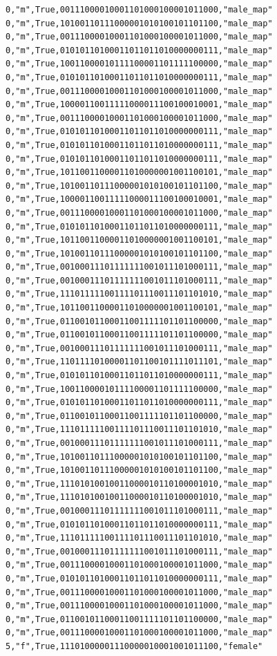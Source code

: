 \documentclass[authoryearcitations]{UoYCSproject}
\begin{document}
\begin{framed}
\begin{verbatim}
0,"m",True,00111000010001101000100001011000,"male_map"
0,"m",True,10100110111000001010100101101100,"male_map"
0,"m",True,00111000010001101000100001011000,"male_map"
0,"m",True,01010110100011011011010000000111,"male_map"
0,"m",True,10011000010111100001101111100000,"male_map"
0,"m",True,01010110100011011011010000000111,"male_map"
0,"m",True,00111000010001101000100001011000,"male_map"
0,"m",True,10000110011111000011100100010001,"male_map"
0,"m",True,00111000010001101000100001011000,"male_map"
0,"m",True,01010110100011011011010000000111,"male_map"
0,"m",True,01010110100011011011010000000111,"male_map"
0,"m",True,01010110100011011011010000000111,"male_map"
0,"m",True,10110011000011010000001001100101,"male_map"
0,"m",True,10100110111000001010100101101100,"male_map"
0,"m",True,10000110011111000011100100010001,"male_map"
0,"m",True,00111000010001101000100001011000,"male_map"
0,"m",True,01010110100011011011010000000111,"male_map"
0,"m",True,10110011000011010000001001100101,"male_map"
0,"m",True,10100110111000001010100101101100,"male_map"
0,"m",True,00100011101111111001011101000111,"male_map"
0,"m",True,00100011101111111001011101000111,"male_map"
0,"m",True,11101111100111101110011101101010,"male_map"
0,"m",True,10110011000011010000001001100101,"male_map"
0,"m",True,01100101100011001111101101100000,"male_map"
0,"m",True,01100101100011001111101101100000,"male_map"
0,"m",True,00100011101111111001011101000111,"male_map"
0,"m",True,11011110100001101100101111011101,"male_map"
0,"m",True,01010110100011011011010000000111,"male_map"
0,"m",True,10011000010111100001101111100000,"male_map"
0,"m",True,01010110100011011011010000000111,"male_map"
0,"m",True,01100101100011001111101101100000,"male_map"
0,"m",True,11101111100111101110011101101010,"male_map"
0,"m",True,00100011101111111001011101000111,"male_map"
0,"m",True,10100110111000001010100101101100,"male_map"
0,"m",True,10100110111000001010100101101100,"male_map"
0,"m",True,11101010010011000010110100001010,"male_map"
0,"m",True,11101010010011000010110100001010,"male_map"
0,"m",True,00100011101111111001011101000111,"male_map"
0,"m",True,01010110100011011011010000000111,"male_map"
0,"m",True,11101111100111101110011101101010,"male_map"
0,"m",True,00100011101111111001011101000111,"male_map"
0,"m",True,00111000010001101000100001011000,"male_map"
0,"m",True,01010110100011011011010000000111,"male_map"
0,"m",True,00111000010001101000100001011000,"male_map"
0,"m",True,00111000010001101000100001011000,"male_map"
0,"m",True,01100101100011001111101101100000,"male_map"
0,"m",True,00111000010001101000100001011000,"male_map"
5,"f",True,11101000001110000010001001011100,"female"

\end{verbatim}
\end{framed}
\end{document}
